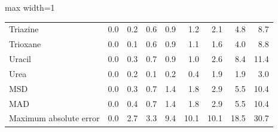 \begin{table}[h]
\begin{adjustbox}{max width=1\textwidth}
\begin{tabular}{lrrrrrrrr}
Triazine & 0.0 & 0.2 & 0.6 & 0.9 & 1.2 & 2.1 & 4.8 & 8.7 \\
Trioxane & 0.0 & 0.1 & 0.6 & 0.9 & 1.1 & 1.6 & 4.0 & 8.8 \\
Uracil & 0.0 & 0.3 & 0.7 & 0.9 & 1.0 & 2.6 & 8.4 & 11.4 \\
Urea & 0.0 & 0.2 & 0.1 & 0.2 & 0.4 & 1.9 & 1.9 & 3.0 \\
MSD & 0.0 & 0.3 & 0.7 & 1.4 & 1.8 & 2.9 & 5.5 & 10.4 \\
MAD & 0.0 & 0.4 & 0.7 & 1.4 & 1.8 & 2.9 & 5.5 & 10.4 \\
Maximum absolute error & 0.0 & 2.7 & 3.3 & 9.4 & 10.1 & 10.1 & 18.5 & 30.7 \\
\bottomrule
\end{tabular}
\end{adjustbox}

\end{table}